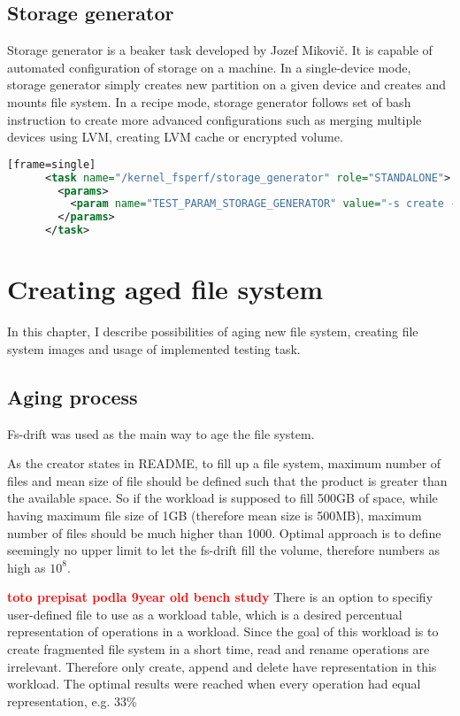 \documentclass[
  color, %
  table, %
  lof,   %
  lot,   %
]{fithesis3}
\newcommand{\todo}[1]{\textcolor{red}{\textbf{#1}}}
\begin{document}
\section{Storage generator}
Storage generator is a beaker task developed by Jozef Mikovič. It is capable of automated configuration of storage on a machine. In a single-device mode, storage generator simply creates new partition on a given device and creates and mounts file system. In a recipe mode, storage generator follows set of bash instruction to create more advanced configurations such as merging multiple devices using LVM, creating LVM cache or encrypted volume.

\begin{lstlisting}[language=xml, caption={Configuring storage using storage generator in beaker environment}][frame=single]
      <task name="/kernel_fsperf/storage_generator" role="STANDALONE">
        <params>
          <param name="TEST_PARAM_STORAGE_GENERATOR" value="-s create -f xfs -t lvm -m /RHTSspareLUN1 -r jokerlvm -T 2SATASSDLVM_xfs"/>
        </params>
      </task>
\end{lstlisting}

\chapter{Creating aged file system}
In this chapter, I describe possibilities of aging new file system, creating file system images and usage of implemented testing task.



\section{Aging process}
Fs-drift was used as the main way to age the file system. 

As the creator states in README, to fill up a file system, maximum number of files and mean size of file should be defined such that the product is greater than the available space. So if the workload is supposed to fill 500GB of space, while having maximum file size of 1GB (therefore mean size is 500MB), maximum number of files should be much higher than 1000. Optimal approach is to define seemingly no upper limit to let the fs-drift fill the volume, therefore numbers as high as $10^8$.


\todo{toto prepisat podla 9year old bench study}
There is an option to specifiy user-defined file to use as a workload table, which is a desired percentual representation of operations in a workload. Since the goal of this workload is to create fragmented file system in a short time, read and rename operations are irrelevant. Therefore only create, append and delete have representation in this workload. The optimal results were reached when every operation had equal representation, e.g. 33\%
\end{document}
